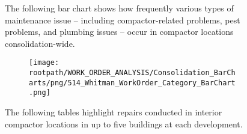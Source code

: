 \begin{figure}[h]
                                \sf
                                The following bar chart shows how frequently various types of maintenance issue -- including compactor-related problems, pest problems, and plumbing issues -- occur in compactor locations consolidation-wide.
                                \raggedright
                                \begin{subfigure}{\textwidth}
                                \texttt{[image: \\rootpath/WORK\_ORDER\_ANALYSIS/Consolidation\_BarCharts/png/514\_Whitman\_WorkOrder\_Category\_BarChart.png]}
                                \end{subfigure}
                                \end{figure}
\begin{figure}[h]
                                \raggedright
                                \sf
                                The following tables highlight repairs conducted in interior compactor locations in up to five buildings at each development.\\
                                
\end{figure}
